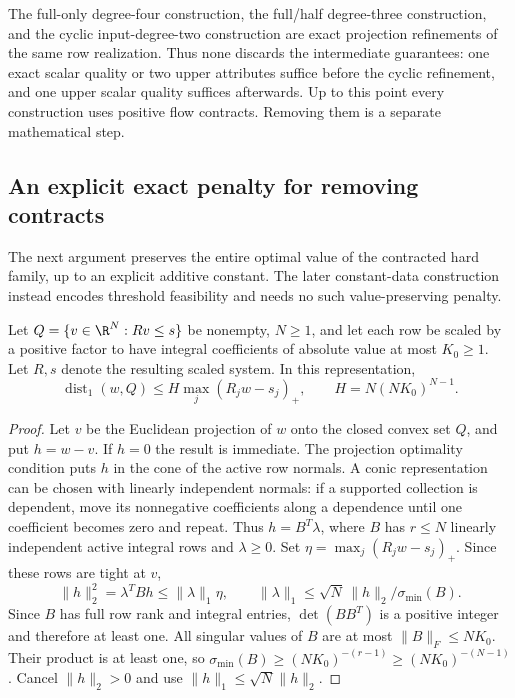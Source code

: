 The full-only degree-four construction, the full/half degree-three
construction, and the cyclic input-degree-two construction are exact
projection refinements of the same row realization. Thus none discards
the intermediate guarantees: one exact scalar quality or two upper
attributes suffice before the cyclic refinement, and one upper scalar
quality suffices afterwards. Up to this point every construction uses
positive flow contracts. Removing them is a separate mathematical step.

\subsection{An explicit exact penalty for removing contracts}\label{s3:penalty}

The next argument preserves the entire optimal value of the contracted
hard family, up to an explicit additive constant. The later constant-data
construction instead encodes threshold feasibility and needs no such
value-preserving penalty.

\begin{lemma}\label{s3:hoffman}
Let $Q=\{v\in\R^N:Rv\le s\}$ be nonempty, $N\ge1$, and let each row
be scaled by a positive factor to have integral coefficients of absolute
value at most $K_0\ge1$. Let $R,s$ denote the resulting scaled system. In this representation,
\begin{equation}
 \operatorname{dist}_1(w,Q)\le H\max_j(R_jw-s_j)_+,
 \qquad H=N(NK_0)^{N-1}.\label{s3:hoffman-bound}
\end{equation}
\end{lemma}
\begin{proof}
Let $v$ be the Euclidean projection of $w$ onto the closed convex set
$Q$, and put $h=w-v$. If $h=0$ the result is immediate. The projection
optimality condition puts $h$ in the cone of the active row normals.
A conic representation can be chosen with linearly independent normals:
if a supported collection is dependent, move its nonnegative coefficients
along a dependence until one coefficient becomes zero and repeat. Thus
$h=B^T\lambda$, where $B$ has $r\le N$ linearly independent active
integral rows and $\lambda\ge0$. Set
$\eta=\max_j(R_jw-s_j)_+$. Since these rows are tight at $v$,
\[
 \|h\|_2^2=\lambda^TBh\le\|\lambda\|_1\eta,
 \qquad
 \|\lambda\|_1\le\sqrt N\,\|h\|_2/\sigma_{\min}(B).
\]
Since $B$ has full row rank and integral entries, $\det(BB^T)$ is
a positive integer and therefore at least one. All singular values
of $B$ are at most $\|B\|_F\le NK_0$. Their product is at least one,
so $\sigma_{\min}(B)\ge(NK_0)^{-(r-1)}\ge(NK_0)^{-(N-1)}$.
Cancel $\|h\|_2>0$ and use $\|h\|_1\le\sqrt N\|h\|_2$.
\end{proof}

